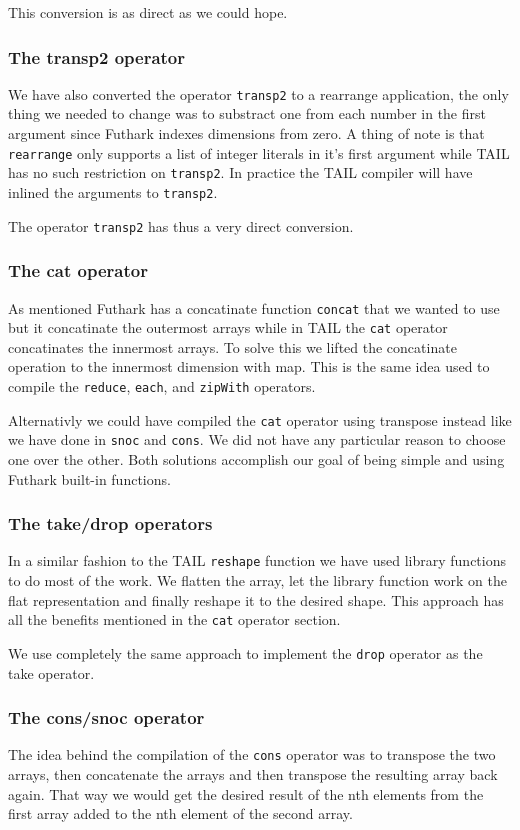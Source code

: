 \documentclass[11pt]{article}
\begin{document}
This conversion is as direct as we could hope.

\subsubsection{The transp2 operator} 
We have also converted the operator {\tt transp2} to a rearrange application, the only thing we needed to change was to substract
one from each number in the first argument since Futhark indexes dimensions from zero.
A thing of note is that {\tt rearrange} only supports a list of integer literals in it's first argument while TAIL has no
such restriction on {\tt transp2}. In practice the TAIL compiler will have inlined the arguments to {\tt transp2}.

The operator {\tt transp2} has thus a very direct conversion.

\subsubsection{The cat operator} 
As mentioned Futhark has a concatinate function {\tt concat} that we wanted to use but it concatinate the outermost arrays while in TAIL the {\tt cat} operator concatinates the innermost arrays. To solve this we lifted the concatinate operation to the innermost dimension with map. This is the same idea used to compile the {\tt reduce}, {\tt each}, and {\tt zipWith} operators. 

Alternativly we could have compiled the {\tt cat} operator using transpose instead like we have done in {\tt snoc} and {\tt cons}. We did not have any particular reason to choose one over the other. Both solutions accomplish our goal of being simple and using Futhark built-in functions. 

\subsubsection{The take/drop operators} 
In a similar fashion to the TAIL {\tt reshape} function we have used library functions to do most of the work.
We flatten the array, let the library function work on the flat representation and finally reshape it to the desired shape.
This approach has all the benefits mentioned in the {\tt cat} operator section.

We use completely the same approach to implement the {\tt drop} operator as the take operator.

\subsubsection{The cons/snoc operator}
The idea behind the compilation of the {\tt cons} operator was to transpose the two arrays,
then concatenate the arrays and then transpose the resulting array back again.
That way we would get the desired result of the nth elements from the first array added to the nth element of the second array.
\end{document}
